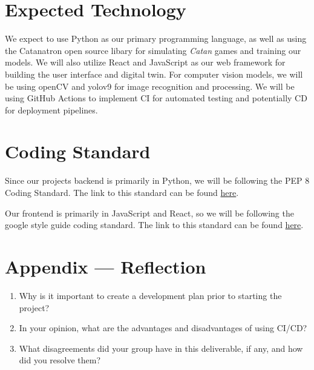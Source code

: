 \documentclass{article}
\begin{document}
\section{Expected Technology}

\raggedright
We expect to use Python as our primary programming 
language, as well as using the Catanatron open source 
libary for simulating \emph{Catan} games and training our models.
We will also utilize React and JavaScript as 
our web framework for building the user interface and 
digital twin. For computer vision models, we will be using
openCV and yolov9 for image recognition and processing.
We will be using GitHub Actions to implement CI for automated testing and potentially CD for deployment pipelines.


\section{Coding Standard}

Since our projects backend is primarily in Python, we will be following the PEP 8 Coding
Standard. The link to this standard can be found
\href{https://peps.python.org/pep-0008/}{here}.

\medskip

Our frontend is primarily in JavaScript and React, so we will be following the google style guide
coding standard. The link to this standard can be found \href{https://google.github.io/styleguide/jsguide.html}{here}.

\newpage{}

\section*{Appendix --- Reflection}

%

\begin{enumerate}
    \item Why is it important to create a development plan prior to starting the
    project?
    \item In your opinion, what are the advantages and disadvantages of using
    CI/CD?
    \item What disagreements did your group have in this deliverable, if any,
    and how did you resolve them?
\end{enumerate}
\end{document}
